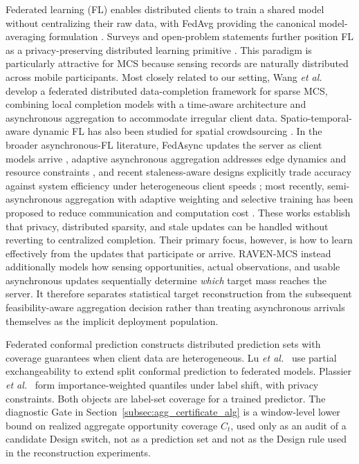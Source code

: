 \documentclass[letterpaper,journal]{IEEEtran}
\begin{document}
Federated learning (FL) enables distributed clients to train a shared model
without centralizing their raw data, with FedAvg providing the canonical
model-averaging formulation \cite{mcmahan2017communication,yang2019federated}.
Surveys and open-problem statements further position FL as a privacy-preserving
distributed learning primitive
\cite{kairouz2021advances,li2020federated}.  This paradigm is
particularly attractive for MCS because sensing records are naturally
distributed across mobile participants.  Most closely related to our setting,
Wang \emph{et al.}~\cite{wang2026federated} develop a federated distributed
data-completion framework for sparse MCS, combining local completion models
with a time-aware architecture and asynchronous aggregation to accommodate
irregular client data.  Spatio-temporal-aware dynamic FL has also been studied
for spatial crowdsourcing \cite{li2026stdfl}.  In the broader asynchronous-FL
literature, FedAsync updates the server as client models arrive
\cite{xie2019asynchronous}, adaptive asynchronous aggregation addresses edge
dynamics and resource constraints
\cite{liu2023adaptive,sun2024staleness}, and recent staleness-aware designs
explicitly trade accuracy against system efficiency under heterogeneous client
speeds \cite{sun2024staleness}; most recently, semi-asynchronous aggregation
with adaptive weighting and selective training has been proposed to reduce
communication and computation cost \cite{islam2025seafl}.  These
works establish that privacy, distributed sparsity, and stale updates can be
handled without reverting to centralized completion.  Their primary focus,
however, is how to learn effectively from the updates that participate or
arrive.  RAVEN-MCS instead additionally models how sensing opportunities,
actual observations, and usable asynchronous updates sequentially determine
\emph{which} target mass reaches the server.  It therefore separates
statistical target reconstruction from the subsequent feasibility-aware
aggregation decision rather than treating asynchronous arrivals themselves as
the implicit deployment population.

Federated conformal prediction constructs distributed prediction sets
with coverage guarantees when client data are heterogeneous.
Lu \emph{et al.}~\cite{lu2023federated} use partial exchangeability to
extend split conformal prediction to federated models.
Plassier \emph{et al.}~\cite{plassier2023conformal} form importance-weighted
quantiles under label shift, with privacy constraints.
Both objects are label-set coverage for a trained predictor.
The diagnostic Gate in Section~\ref{subsec:agg_certificate_alg} is a
window-level lower bound on realized aggregate opportunity coverage
$C_t$, used only as an audit of a candidate Design switch, not as a
prediction set and not as the Design rule used in the reconstruction
experiments.
\end{document}
